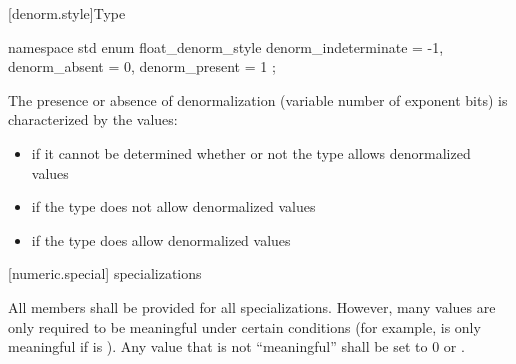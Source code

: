 [denorm.style]{Type }

%
\begin{codeblock}
namespace std {
  enum float_denorm_style {
    denorm_indeterminate = -1,
    denorm_absent = 0,
    denorm_present = 1
  };
}
\end{codeblock}

\pnum
The presence or absence of denormalization (variable number of exponent bits)
is characterized by the values:

\begin{itemize}
\item
{}%
if it cannot be determined whether or not the type allows denormalized values
\item
{}%
if the type does not allow denormalized values
\item
{}%
if the type does allow denormalized values
\end{itemize}

[numeric.special]{ specializations}

\pnum
All members shall be provided for all specializations.
However, many values are only required to be meaningful under certain
conditions
(for example,
is only meaningful if
is
).
Any value that is not ``meaningful'' shall be set to 0 or
.

